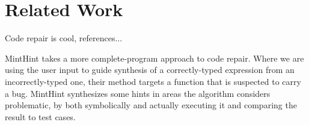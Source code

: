 \section{Related Work}
\label{sec:related}


Code repair is cool, references...

MintHint \cite{MintHint} takes a more complete-program approach to code repair. 
Where we are using the user input to guide synthesis of a correctly-typed expression from an incorrectly-typed one, 
their method targets a function that is suspected to carry a bug. MintHint synthesizes some hints in areas the algorithm considers problematic, by 
both symbolically and actually executing it and comparing the result to test cases.
